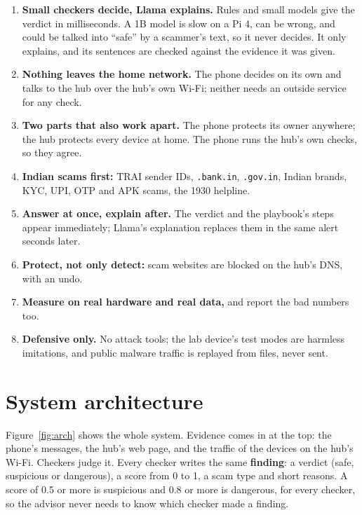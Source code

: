 \documentclass[11pt,a4paper]{article}
\newcommand{\code}[1]{\texttt{#1}}
\begin{document}
\begin{enumerate}[label=\textbf{P\arabic*.}]
  \item \textbf{Small checkers decide, Llama explains.} Rules and small models give the verdict in
        milliseconds. A 1B model is slow on a Pi 4, can be wrong, and could be talked into ``safe'' by a
        scammer's text, so it never decides. It only explains, and its sentences are checked against the
        evidence it was given.
  \item \textbf{Nothing leaves the home network.} The phone decides on its own and talks to the hub over the
        hub's own Wi-Fi; neither needs an outside service for any check.
  \item \textbf{Two parts that also work apart.} The phone protects its owner anywhere; the hub protects every
        device at home. The phone runs the hub's own checks, so they agree.
  \item \textbf{Indian scams first:} TRAI sender IDs, \code{.bank.in}, \code{.gov.in}, Indian brands, KYC, UPI,
        OTP and APK scams, the 1930 helpline.
  \item \textbf{Answer at once, explain after.} The verdict and the playbook's steps appear immediately;
        Llama's explanation replaces them in the same alert seconds later.
  \item \textbf{Protect, not only detect:} scam websites are blocked on the hub's DNS, with an undo.
  \item \textbf{Measure on real hardware and real data,} and report the bad numbers too.
  \item \textbf{Defensive only.} No attack tools; the lab device's test modes are harmless imitations, and public
        malware traffic is replayed from files, never sent.
\end{enumerate}

\section{System architecture}
\label{sec:arch}

Figure~\ref{fig:arch} shows the whole system. Evidence comes in at the top: the phone's messages, the hub's
web page, and the traffic of the devices on the hub's Wi-Fi. Checkers judge it. Every checker writes the same
\textbf{finding}: a verdict (safe, suspicious or dangerous), a score from 0 to 1, a scam type and short reasons.
A score of 0.5 or more is suspicious and 0.8 or more is dangerous, for every checker, so the advisor never
needs to know which checker made a finding.
\end{document}
